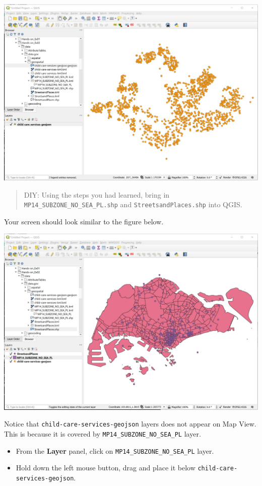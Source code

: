 \documentclass[
  letterpaper,
  DIV=11,
  numbers=noendperiod]{scrreprt}
\providecommand{\tightlist}{%
  \setlength{\itemsep}{0pt}\setlength{\parskip}{0pt}}\usepackage{longtable,booktabs,array}
\begin{document}
\includegraphics{./img02/image5.jpg}

\begin{quote}
DIY: Using the steps you had learned, bring in
\texttt{MP14\_SUBZONE\_NO\_SEA\_PL.shp} and
\texttt{StreetsandPlaces.shp} into QGIS.
\end{quote}

Your screen should look similar to the figure below.

\includegraphics{./img02/image6.jpg}

Notice that \texttt{child-care-services-geojson} layers does not appear
on Map View. This is because it is covered by
\texttt{MP14\_SUBZONE\_NO\_SEA\_PL} layer.

\begin{itemize}
\tightlist
\item
  From the \textbf{Layer} panel, click on
  \texttt{MP14\_SUBZONE\_NO\_SEA\_PL} layer.
\item
  Hold down the left mouse button, drag and place it below
  \texttt{child-care-services-geojson}.
\end{itemize}
\end{document}
